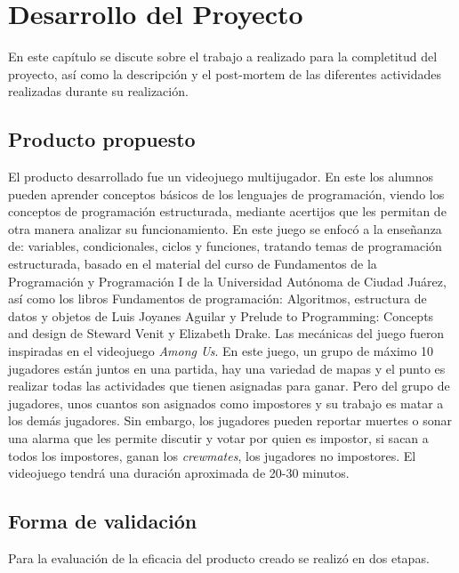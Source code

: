 \chapter{Desarrollo del Proyecto}
En este capítulo se discute sobre el trabajo a realizado para la completitud del proyecto, así como la descripción y el post-mortem de las diferentes actividades realizadas durante su realización.

\section{Producto propuesto}
El producto desarrollado fue un videojuego multijugador. En este los alumnos pueden aprender conceptos básicos de los lenguajes de programación, viendo los conceptos de programación estructurada, mediante acertijos que les permitan de otra manera analizar su funcionamiento. En este juego se enfocó a la enseñanza de: variables, condicionales, ciclos y funciones, tratando temas de programación estructurada, basado en el material del curso de Fundamentos de la Programación y Programación I de la Universidad Autónoma de Ciudad Juárez, así como los libros Fundamentos de programación: Algoritmos, estructura de datos y objetos de Luis Joyanes Aguilar y Prelude to Programming: Concepts and design de Steward Venit y Elizabeth Drake. 
Las mecánicas del juego fueron inspiradas en el videojuego \textit{Among Us}. En este juego, un grupo de máximo 10 jugadores están juntos en una partida, hay una variedad de mapas y el punto es realizar todas las actividades que tienen asignadas para ganar. Pero del grupo de jugadores, unos cuantos son asignados como impostores y su trabajo es matar a los demás jugadores. Sin embargo, los jugadores pueden reportar muertes o sonar una alarma que les permite discutir y votar por quien es impostor, si sacan a todos los impostores, ganan los \textit{crewmates}, los jugadores no impostores.
El videojuego tendrá una duración aproximada de 20-30 minutos.

\section{Forma de validación}
Para la evaluación de la eficacia del producto creado se realizó en dos etapas.

